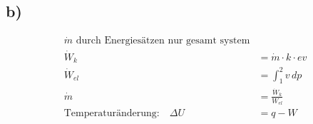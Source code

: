 

\subsection*{b)}

\begin{align*}
\dot{m} \text{ durch Energiesätzen nur gesamt system} \\
\dot{W}_k &= \dot{m} \cdot k \cdot ev \\
\dot{W}_{el} &= \int_{1}^{2} v \, dp \\
\dot{m} &= \frac{\dot{W}_k}{W_{el}} \\
\text{Temperaturänderung:} \quad \Delta U &= q - W
\end{align*}